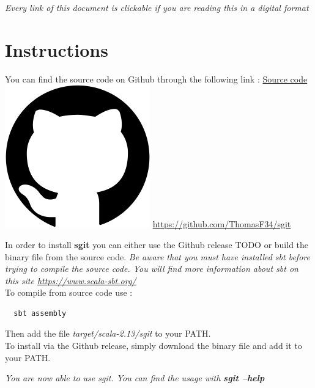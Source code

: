 \documentclass[11pt]{article}
\begin{document}


\newpage
\thispagestyle{empty}
\addtocounter{page}{-1}
\tableofcontents
\vfill
\textit{Every link of this document is clickable if you are reading this in a digital format}
\vfill
\clearpage

\section{Instructions}

You can find the source code on Github through the following link : \href{https://github.com/ThomasF34/sgit}{Source code \includegraphics[height=\fontcharht\font`\l]{img/github.png}} {\ul{https://github.com/ThomasF34/sgit}}\newline

In order to install \textbf{sgit} you can either use the Github release TODO or build the binary file from the source code. \textit{Be aware that you must have installed sbt before trying to compile the source code. You will find more information about \textit{sbt} on this site \href{https://www.scala-sbt.org/}{https://www.scala-sbt.org/}}\\

To compile from source code use :
\begin{lstlisting}
  sbt assembly
\end{lstlisting}

Then add the file \textit{target/scala-2.13/sgit} to your PATH.\\

To install via the Github release, simply download the binary file and add it to your PATH.\\

\begin{center}
  \textit{You are now able to use sgit. You can find the usage with \textbf{sgit --help}}
\end{center}
\end{document}

